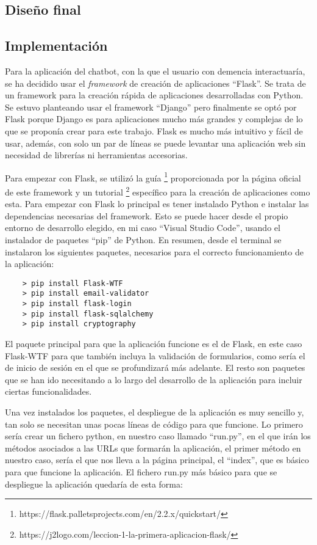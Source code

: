 \subsection{Diseño final}

\subsection{Implementación}

Para la aplicación del chatbot, con la que el usuario con demencia interactuaría, se ha decidido usar el \textit{framework} de creación de aplicaciones ``Flask''. Se trata de un framework para la creación rápida de aplicaciones desarrolladas con Python. Se estuvo planteando usar el framework ``Django'' pero finalmente se optó por Flask porque Django es para aplicaciones mucho más grandes y complejas de lo que se proponía crear para este trabajo. Flask es mucho más intuitivo y fácil de usar, además, con solo un par de líneas se puede levantar una aplicación web sin necesidad de librerías ni herramientas accesorias. 

Para empezar con Flask, se utilizó la guía \footnote{https://flask.palletsprojects.com/en/2.2.x/quickstart/} proporcionada por la página oficial de este framework y un tutorial \footnote{https://j2logo.com/leccion-1-la-primera-aplicacion-flask/} específico para la creación de aplicaciones como esta. Para empezar con Flask lo principal es tener instalado Python e instalar las dependencias necesarias del framework. Esto se puede hacer desde el propio entorno de desarrollo elegido, en mi caso ``Visual Studio Code'', usando el instalador de paquetes ``pip'' de Python. En resumen, desde el terminal se instalaron los siguientes paquetes, necesarios para el correcto funcionamiento de la aplicación:

\begin{verbatim}
	> pip install Flask-WTF
	> pip install email-validator
	> pip install flask-login
	> pip install flask-sqlalchemy
	> pip install cryptography
\end{verbatim}

El paquete principal para que la aplicación funcione es el de Flask, en este caso Flask-WTF para que también incluya la validación de formularios, como sería el de inicio de sesión en el que se profundizará más adelante. El resto son paquetes que se han ido necesitando a lo largo del desarrollo de la aplicación para incluir ciertas funcionalidades. 

Una vez instalados los paquetes, el despliegue de la aplicación es muy sencillo y, tan solo se necesitan unas pocas líneas de código para que funcione. Lo primero sería crear un fichero python, en nuestro caso llamado ``run.py'', en el que irán los métodos asociados a las URLs que formarán la aplicación, el primer método en nuestro caso, sería el que nos lleva a la página principal, el ``index'', que es básico para que funcione la aplicación. El fichero run.py más básico para que se despliegue la aplicación quedaría de esta forma:


